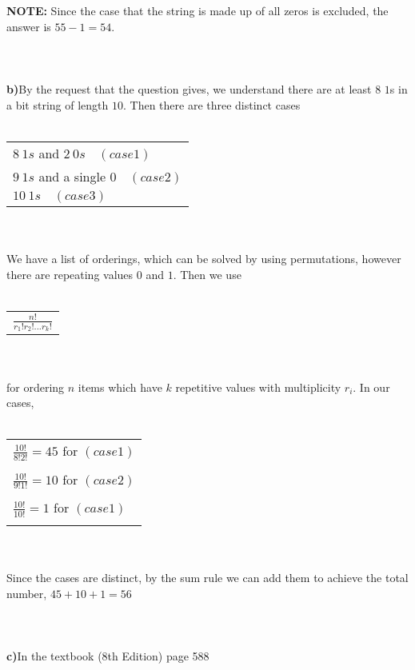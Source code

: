 \documentclass[12pt]{article}
\begin{document}
\\ \\
\textbf{NOTE:} Since the case that the string is made up of all zeros is excluded, the answer is
$55-1=54$.
\\ \\ \\ \\
\textbf{b)}By the request that the question gives, we understand there are at least $8$ $1$s 
in a bit string of length $10$. Then there are three distinct cases
\\ \\
\begin{tabular}{l}
    $8\ 1s$ and $2\ 0s \quad (case 1)$\\
    $9\ 1s$ and a single $0 \quad (case 2)$\\
    $10\ 1s \quad (case 3)$\\
\end{tabular}
\\ \\
We have a list of orderings, which can be solved by using permutations, however there are repeating
values $0$ and $1$. Then we use
\\ \\
\begin{tabular}{l}
    $\frac{n!}{r_1!r_2!...r_k!}$\\
\end{tabular}
\\ \\
for ordering $n$ items which have $k$ repetitive values with multiplicity $r_i$. In our cases,
\\ \\
\begin{tabular}{l}
    $\frac{10!}{8!2!}=45$ for $(case 1)$\\
    \\
    $\frac{10!}{9!1!}=10$ for $(case 2)$\\
    \\
    $\frac{10!}{10!}=1$ for $(case 1)$\\
    \\
\end{tabular}
\\ \\
Since the cases are distinct, by the sum rule we can add them to achieve the total number, 
$45+10+1=56$
\\ \\ \\ \\
\textbf{c)}In the textbook (8th Edition) page 588
\end{document}
